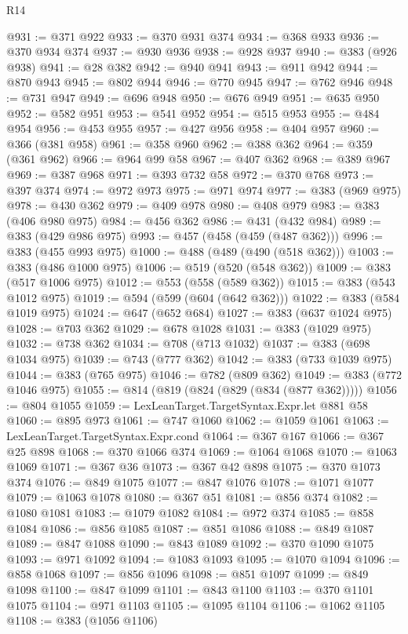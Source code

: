 \begin{lexlean}{R14}
\begin{coremodule}
@931 := @371 @922
@933 := @370 @931 @374
@934 := @368 @933
@936 := @370 @934 @374
@937 := @930 @936
@938 := @928 @937
@940 := @383 (@926 @938)
@941 := @28 @382
@942 := @940 @941
@943 := @911 @942
@944 := @870 @943
@945 := @802 @944
@946 := @770 @945
@947 := @762 @946
@948 := @731 @947
@949 := @696 @948
@950 := @676 @949
@951 := @635 @950
@952 := @582 @951
@953 := @541 @952
@954 := @515 @953
@955 := @484 @954
@956 := @453 @955
@957 := @427 @956
@958 := @404 @957
@960 := @366 (@381 @958)
@961 := @358 @960
@962 := @388 @362
@964 := @359 (@361 @962)
@966 := @964 @99 @58
@967 := @407 @362
@968 := @389 @967
@969 := @387 @968
@971 := @393 @732 @58
@972 := @370 @768
@973 := @397 @374
@974 := @972 @973
@975 := @971 @974
@977 := @383 (@969 @975)
@978 := @430 @362
@979 := @409 @978
@980 := @408 @979
@983 := @383 (@406 @980 @975)
@984 := @456 @362
@986 := @431 (@432 @984)
@989 := @383 (@429 @986 @975)
@993 := @457 (@458 (@459 (@487 @362)))
@996 := @383 (@455 @993 @975)
@1000 := @488 (@489 (@490 (@518 @362)))
@1003 := @383 (@486 @1000 @975)
@1006 := @519 (@520 (@548 @362))
@1009 := @383 (@517 @1006 @975)
@1012 := @553 (@558 (@589 @362))
@1015 := @383 (@543 @1012 @975)
@1019 := @594 (@599 (@604 (@642 @362)))
@1022 := @383 (@584 @1019 @975)
@1024 := @647 (@652 @684)
@1027 := @383 (@637 @1024 @975)
@1028 := @703 @362
@1029 := @678 @1028
@1031 := @383 (@1029 @975)
@1032 := @738 @362
@1034 := @708 (@713 @1032)
@1037 := @383 (@698 @1034 @975)
@1039 := @743 (@777 @362)
@1042 := @383 (@733 @1039 @975)
@1044 := @383 (@765 @975)
@1046 := @782 (@809 @362)
@1049 := @383 (@772 @1046 @975)
@1055 := @814 (@819 (@824 (@829 (@834 (@877 @362)))))
@1056 := @804 @1055
@1059 := LexLeanTarget.TargetSyntax.Expr.let @881 @58
@1060 := @895 @973
@1061 := @747 @1060
@1062 := @1059 @1061
@1063 := LexLeanTarget.TargetSyntax.Expr.cond
@1064 := @367 @167
@1066 := @367 @25 @898
@1068 := @370 @1066 @374
@1069 := @1064 @1068
@1070 := @1063 @1069
@1071 := @367 @36
@1073 := @367 @42 @898
@1075 := @370 @1073 @374
@1076 := @849 @1075
@1077 := @847 @1076
@1078 := @1071 @1077
@1079 := @1063 @1078
@1080 := @367 @51
@1081 := @856 @374
@1082 := @1080 @1081
@1083 := @1079 @1082
@1084 := @972 @374
@1085 := @858 @1084
@1086 := @856 @1085
@1087 := @851 @1086
@1088 := @849 @1087
@1089 := @847 @1088
@1090 := @843 @1089
@1092 := @370 @1090 @1075
@1093 := @971 @1092
@1094 := @1083 @1093
@1095 := @1070 @1094
@1096 := @858 @1068
@1097 := @856 @1096
@1098 := @851 @1097
@1099 := @849 @1098
@1100 := @847 @1099
@1101 := @843 @1100
@1103 := @370 @1101 @1075
@1104 := @971 @1103
@1105 := @1095 @1104
@1106 := @1062 @1105
@1108 := @383 (@1056 @1106)

\end{coremodule}
\end{lexlean}
